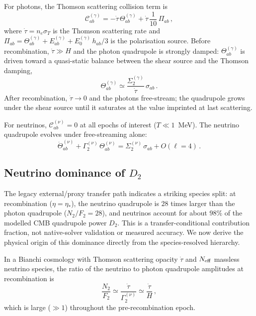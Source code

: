 For photons, the Thomson scattering collision term is
\begin{equation}\label{eq:Thomson-damping}
\mathcal{C}^{(\gamma)}_{ab}
= -\dot{\tau}\, \Theta^{(\gamma)}_{ab}
+ \dot{\tau}\, \frac{1}{10}\,\Pi_{ab}\,,
\end{equation}
where $\dot{\tau} = n_e \sigma_T$ is the Thomson
scattering rate and $\Pi_{ab} = \Theta^{(\gamma)}_{ab}
+ E^{(\gamma)}_{ab} + E^{(\gamma)}_0\,h_{ab}/3$ is the
polarisation source.  Before recombination,
$\dot{\tau} \gg H$ and the photon quadrupole is strongly
damped: $\Theta^{(\gamma)}_{ab}$ is driven toward a
quasi-static balance between the shear source and the
Thomson damping,
\begin{equation}\label{eq:quasi-static}
\Theta^{(\gamma)}_{ab}
\simeq \frac{\Sigma^{(\gamma)}_2}{\dot{\tau}}\,
  \sigma_{ab}\,.
\end{equation}
After recombination, $\dot{\tau} \to 0$ and the photons
free-stream; the quadrupole grows under the shear source
until it saturates at the value imprinted at last
scattering.

For neutrinos, $\mathcal{C}^{(\nu)}_{ab} = 0$ at all
epochs of interest ($T \ll 1$~MeV).  The neutrino
quadrupole evolves under free-streaming alone:
\begin{equation}\label{eq:nu-free-stream}
\dot{\Theta}^{(\nu)}_{ab}
+ \Gamma^{(\nu)}_2\, \Theta^{(\nu)}_{ab}
= \Sigma^{(\nu)}_2\, \sigma_{ab}
+ O(\ell = 4)\,.
\end{equation}


\subsection{Neutrino dominance of $D_2$}
\label{sec:nu-dominance}
\label{sec:sp03-result}

The legacy external/proxy transfer path indicates a striking
species split: at recombination ($\eta = \eta_*$), the neutrino
quadrupole is $28$ times larger than the photon quadrupole
($N_2/F_2 = 28$), and neutrinos account for about $98\%$ of the
modelled CMB quadrupole power $D_2$.  This is a
transfer-conditional contribution fraction, not native-solver
validation or measured accuracy.
We now derive the physical origin of this dominance
directly from the species-resolved hierarchy.

\begin{proposition}
\label{prop:nu-dominance}
In a Bianchi cosmology with Thomson scattering
opacity $\dot{\tau}$ and $N_{\rm eff}$ massless
neutrino species, the ratio of the neutrino to photon
quadrupole amplitudes at recombination is
\begin{equation}\label{eq:N2-F2-ratio}
\frac{N_2}{F_2}
\simeq \frac{\dot{\tau}}{\Gamma^{(\nu)}_2}
\simeq \frac{\dot{\tau}}{H}\,,
\end{equation}
which is large ($\gg 1$) throughout the
pre-recombination epoch.
\end{proposition}

